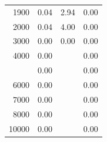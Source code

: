 \documentclass[12pt]{article}
\begin{document}
\begin{minipage}{0.5\textwidth}
\begin{tabular}{rccc}
   1900 & 0.04 & 2.94 & 0.00 \\ 
   2000 & 0.04 & 4.00 & 0.00 \\ 
   3000 & 0.00 & 0.00 & 0.00 \\ 
   4000 & 0.00 &  & 0.00 \\  \addlinespace
   5000 & 0.00 &  & 0.00 \\ 
   6000 & 0.00 &  & 0.00 \\ 
   7000 & 0.00 &  & 0.00 \\ 
   8000 & 0.00 &  & 0.00 \\ 
  10000 & 0.00 &  & 0.00 \\ 
\bottomrule
\end{tabular}

\end{minipage}



%
\end{document}
